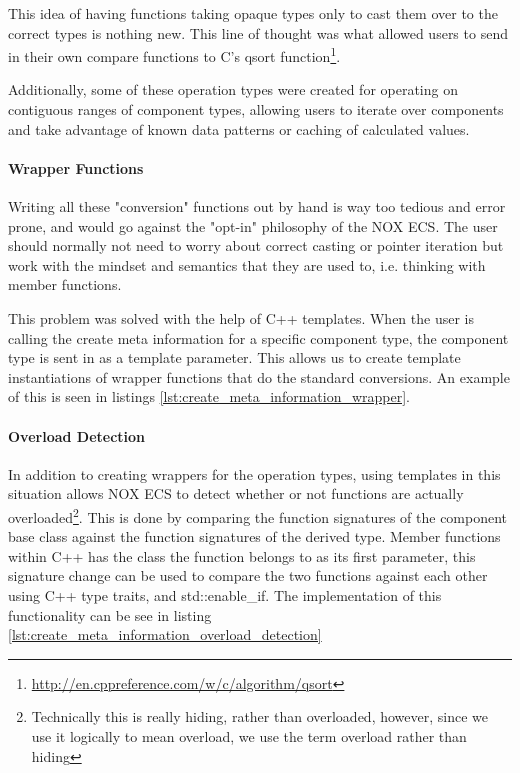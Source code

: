 This idea of having functions taking opaque types only to cast them over to the correct types is nothing new.
This line of thought was what allowed users to send in their own compare functions to C's qsort function\footnote{\url{http://en.cppreference.com/w/c/algorithm/qsort}}.

Additionally, some of these operation types were created for operating on contiguous ranges of component types,
allowing users to iterate over components and take advantage of known data patterns or caching of calculated values.

\paragraph{Wrapper Functions}
Writing all these "conversion" functions out by hand is way too tedious and error prone, and would go against the "opt-in" philosophy of the NOX ECS.
The user should normally not need to worry about correct casting or pointer iteration but work with the mindset and semantics that they are used to, i.e. thinking with member functions.

This problem was solved with the help of C++ templates.
When the user is calling the create meta information for a specific component type,
the component type is sent in as a template parameter.
This allows us to create template instantiations of wrapper functions that do the standard conversions.
An example of this is seen in listings \ref{lst:create_meta_information_wrapper}.


\paragraph{Overload Detection}
In addition to creating wrappers for the operation types, using templates in this situation
allows NOX ECS to detect whether or not functions are actually overloaded\footnote{Technically this is really hiding, rather than overloaded, however, since we use it logically to mean overload, we use the term overload rather than hiding}.
This is done by comparing the function signatures of the component base class against the function signatures of the derived type.
Member functions within C++ has the class the function belongs to as its first parameter\cite{iso_cpp_member_function_pointers},
this signature change can be used to compare the two functions against each other using C++ type traits, and std::enable\_if.
The implementation of this functionality can be see in listing \ref{lst:create_meta_information_overload_detection}

